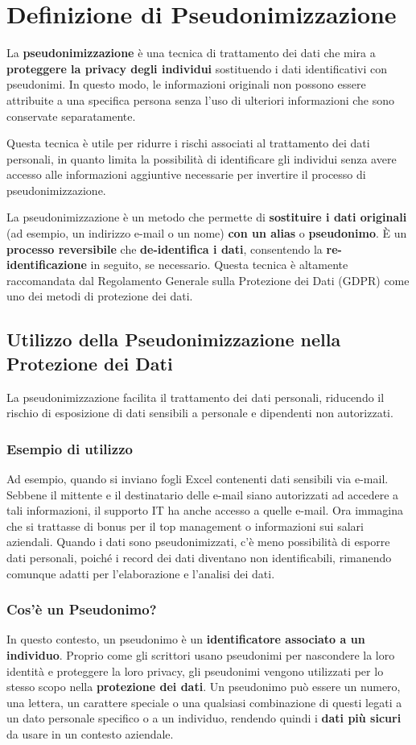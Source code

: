 \chapter{Definizione di Pseudonimizzazione}


La \textbf{pseudonimizzazione} è una tecnica di trattamento dei dati che mira a\textbf{ proteggere la privacy degli individui} sostituendo i dati identificativi con pseudonimi. In questo modo, le informazioni originali non possono essere attribuite a una specifica persona senza l'uso di ulteriori informazioni che sono conservate separatamente.

Questa tecnica è utile per ridurre i rischi associati al trattamento dei dati personali, in quanto limita la possibilità di identificare gli individui senza avere accesso alle informazioni aggiuntive necessarie per invertire il processo di pseudonimizzazione.

La pseudonimizzazione è un metodo che permette di \textbf{sostituire i dati originali} (ad esempio, un indirizzo e-mail o un nome) \textbf{con un alias} o \textbf{pseudonimo}. È un \textbf{processo reversibile} che \textbf{de-identifica i dati}, consentendo la\textbf{ re-identificazione} in seguito, se necessario. Questa tecnica è altamente raccomandata dal Regolamento Generale sulla Protezione dei Dati (GDPR) come uno dei metodi di protezione dei dati.

\section{Utilizzo della Pseudonimizzazione nella Protezione dei Dati}
La pseudonimizzazione facilita il trattamento dei dati personali, riducendo il rischio di esposizione di dati sensibili a personale e dipendenti non autorizzati.

\subsection{Esempio di utilizzo}
Ad esempio, quando si inviano fogli Excel contenenti dati sensibili via e-mail. Sebbene il mittente e il destinatario delle e-mail siano autorizzati ad accedere a tali informazioni, il supporto IT ha anche accesso a quelle e-mail. Ora immagina che si trattasse di bonus per il top management o informazioni sui salari aziendali. Quando i dati sono pseudonimizzati, c'è meno possibilità di esporre dati personali, poiché i record dei dati diventano non identificabili, rimanendo comunque adatti per l'elaborazione e l'analisi dei dati.

\subsection{Cos'è un Pseudonimo?}
In questo contesto, un pseudonimo è un \textbf{identificatore associato a un individuo}. Proprio come gli scrittori usano pseudonimi per nascondere la loro identità e proteggere la loro privacy, gli pseudonimi vengono utilizzati per lo stesso scopo nella \textbf{protezione dei dati}. Un pseudonimo può essere un numero, una lettera, un carattere speciale o una qualsiasi combinazione di questi legati a un dato personale specifico o a un individuo, rendendo quindi i \textbf{dati più sicuri} da usare in un contesto aziendale.